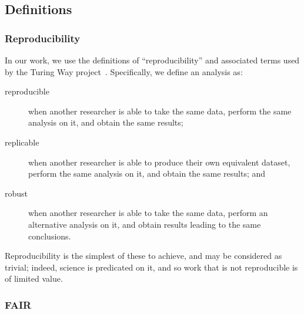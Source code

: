 \documentclass{article}
\begin{document}
\subsection{Definitions}\label{sec:definitions}

\subsubsection{Reproducibility}\label{sec:reproducibility}

In our work,
we use the definitions of ``reproducibility'' and associated terms
used by the Turing Way project~\cite{the_turing_way_community_2023_7625728}.
Specifically,
we define an analysis as:
\begin{description}
  \item[reproducible]
        when another researcher is able to take the same data,
        perform the same analysis on it,
        and obtain the same results;
  \item[replicable]
        when another researcher is able to produce their own equivalent dataset,
        perform the same analysis on it,
        and obtain the same results;
        and
  \item[robust]
        when another researcher is able to take the same data,
        perform an alternative analysis on it,
        and obtain results leading to the same conclusions.
\end{description}
Reproducibility is the simplest of these to achieve,
and may be considered as trivial;
indeed,
science is predicated on it,
and so work that is not reproducible is of limited value.

\subsubsection{FAIR}
\end{document}
